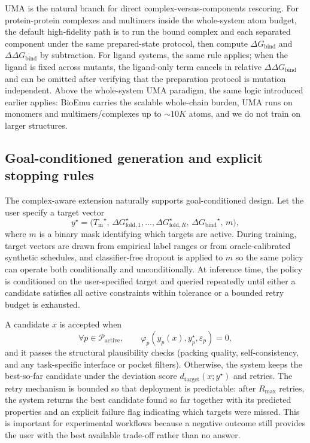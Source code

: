 \documentclass[11pt]{article}
\newcommand{\Tm}{\ensuremath{T_{\mathrm m}}}
\newcommand{\DGbind}{\ensuremath{\Delta G_{\mathrm{bind}}}}
\newcommand{\DDGbind}{\ensuremath{\Delta\Delta G_{\mathrm{bind}}}}
\begin{document}
	UMA is the natural branch for direct complex-versus-components rescoring. For protein-protein complexes and multimers inside the whole-system atom budget, the default high-fidelity path is to run the bound complex and each separated component under the same prepared-state protocol, then compute $\DGbind$ and $\DDGbind$ by subtraction. For ligand systems, the same rule applies; when the ligand is fixed across mutants, the ligand-only term cancels in relative $\DDGbind$ and can be omitted after verifying that the preparation protocol is mutation independent. Above the whole-system UMA paradigm, the same logic introduced earlier applies: BioEmu carries the scalable whole-chain burden, UMA runs on monomers and multimers/complexes up to $\sim 10K$ atoms, and we do not train on larger structures. 
	
	\subsection{Goal-conditioned generation and explicit stopping rules}
	
	The complex-aware extension naturally supports goal-conditioned design. Let the user specify a target vector
	\begin{equation}
		y^\star = \big(\Tm^\star,\,\Delta G_{\mathrm{fold},1}^\star,\ldots,\Delta G_{\mathrm{fold},R}^\star,\,\DGbind^\star,\,m\big),
	\end{equation}
	where $m$ is a binary mask identifying which targets are active. During training, target vectors are drawn from empirical label ranges or from oracle-calibrated synthetic schedules, and classifier-free dropout is applied to $m$ so the same policy can operate both conditionally and unconditionally. At inference time, the policy is conditioned on the user-specified target and queried repeatedly until either a candidate satisfies all active constraints within tolerance or a bounded retry budget is exhausted.
	
	A candidate $x$ is accepted when
	\begin{equation}
		\label{eq:targethit_v11}
		\forall p\in \mathcal{P}_{\mathrm{active}},\qquad \varphi_p\!\left(\hat y_p(x),y_p^\star,\varepsilon_p\right)=0,
	\end{equation}
	and it passes the structural plausibility checks (packing quality, self-consistency, and any task-specific interface or pocket filters). Otherwise, the system keeps the best-so-far candidate under the deviation score $d_{\mathrm{target}}(x;y^\star)$ and retries. The retry mechanism is bounded so that deployment is predictable: after $R_{\max}$ retries, the system returns the best candidate found so far together with its predicted properties and an explicit failure flag indicating which targets were missed. This is important for experimental workflows because a negative outcome still provides the user with the best available trade-off rather than no answer.
	
\end{document}
